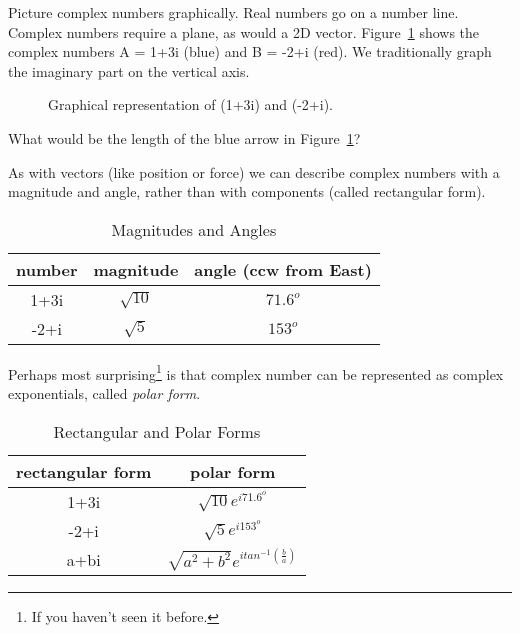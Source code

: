 Picture complex numbers graphically. Real numbers go on a number line. Complex numbers require a plane, as would a 2D vector. Figure~\ref{F:7CN1} shows the complex numbers A = 1+3i (blue) and B = -2+i (red). We traditionally graph the imaginary part on the vertical axis.

\begin{figure}[H]
\begin{center}
\caption{Graphical representation of (1+3i) and (-2+i).}
\label{F:7CN1}
\end{center}
\end{figure}

\begin{alevel}What would be the length of the blue arrow in Figure~\ref{F:7CN1}?\end{alevel}

As with vectors (like position or force) we can describe complex numbers with a magnitude and angle, rather than with components (called rectangular form). 

\begin{table}[H]
\begin{center}
\renewcommand{\arraystretch}{1.5}
\begin{tabular}{|c|c|c|} \hline
number	&magnitude	&angle (ccw from East) \\ \hline
1+3i & $\sqrt{10}$	&$71.6^o$\\ \hline
-2+i& $\sqrt{5}$	&$153^o$\\ \hline
\end{tabular}
\caption{Magnitudes and Angles}
\end{center}
\end{table}

Perhaps most surprising\footnote{If you haven't seen it before.} is that complex number can be represented as complex exponentials, called \emph{polar form}.

\begin{table}[H]
\begin{center}
\renewcommand{\arraystretch}{1.5}
\begin{tabular}{|c|c|} \hline
rectangular form	&polar form\\ \hline
1+3i & $\sqrt{10}e^{i71.6^o}$\\ \hline
-2+i& $\sqrt{5}e^{i153^o}$\\ \hline
a+bi&$\sqrt{a^2+b^2}e^{itan^{-1}(\frac{b}{a})}$ \\ \hline
\end{tabular}
\caption{Rectangular and Polar Forms}
\label{T:6EU}
\end{center}
\end{table}

